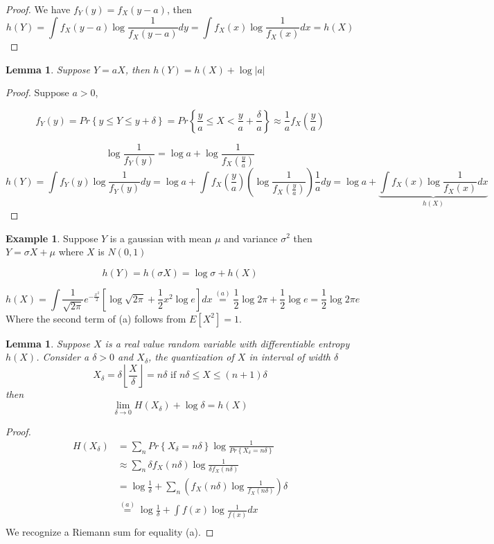 \documentclass[twoside]{article}
\newtheorem{lemma}[theorem]{Lemma}
\theoremstyle{definition} %
\newtheorem{example}{Example}
\renewcommand{\Pr}[1]{Pr\left\{#1\right\}}
\newcommand{\Ex}[1]{E\left[#1\right]}
\newcommand{\pfrac}[2]{\left( \frac{#1}{#2} \right)}
\newcommand{\overeq}[1]{\stackrel{#1}{=}}
\begin{document}
\begin{proof}
  We have $f_Y(y) = f_X(y-a)$, then
  \[
    h(Y) = \int f_X(y-a) \log \frac 1 {f_X(y-a)}dy = \int f_X(x) \log \frac 1 {f_X(x)}dx = h(X)
  \]
\end{proof}

\begin{lemma}
  Suppose $Y=aX$, then $h(Y) = h(X) + \log |a|$
\end{lemma}

\begin{proof}
  Suppose $a > 0$,

  \[
    f_Y(y) = \Pr{y\leq Y \leq y + \delta} = \Pr{\frac y a \leq X < \frac y a + \frac \delta a} \approx \frac 1 a f_X \pfrac y a
  \]

  \[
    \log \frac 1 {f_Y(y)} = \log a + \log \frac 1 {f_X\pfrac y a}
  \]
  \[
    h(Y) = \int f_Y(y) \log \frac 1 {f_Y(y)} dy = \log a + \int f_X \pfrac y a \left(\log \frac 1 {f_X\pfrac y a} \right) \frac 1 a dy = \log a + \underbrace{\int f_X(x) \log \frac 1 {f_X(x)} dx}_{h(X)}
  \]
\end{proof}

\begin{example}
  Suppose $Y$ is a gaussian with mean $\mu$ and variance $\sigma^2$ then $Y=\sigma X + \mu$ where $X$ is $N(0,1)$

  \[
    h(Y) = h(\sigma X) = \log \sigma + h(X)
  \]

  \[
    h(X) = \int \frac 1 {\sqrt{2\pi}} e^{-\frac {x^2} 2} \left[ \log \sqrt{2\pi} + \frac 1 2 x^2 \log e \right] dx
    \overeq{(a)} \frac 1 2 \log 2\pi + \frac 1 2 \log e = \frac 1 2 \log 2\pi e
  \]
  Where the second term of (a) follows from $\Ex{X^2} = 1$.
\end{example}

\begin{lemma}
  Suppose $X$ is a real value random variable with differentiable entropy $h(X)$. Consider a $\delta > 0$ and $X_\delta$, the quantization of $X$ in interval of width $\delta$
  \[
    X_\delta = \delta \left\lfloor \frac X \delta \right\rfloor = n\delta \text{ if } n\delta \leq X \leq (n+1) \delta
  \]
  then
  \[
    \lim_{\delta \to 0} H(X_\delta) + \log \delta = h(X)
  \]
\end{lemma}

\begin{proof}
\begin{align*}
  H(X_\delta) &= \sum_n \Pr{X_\delta = n\delta} \log \frac 1 {\Pr{X_\delta = n\delta}}\\
  &\approx \sum_n \delta f_X(n\delta) \log \frac 1 {\delta f_X(n\delta)}\\
  &= \log \frac 1 \delta + \sum_n \left(f_X(n\delta) \log \frac 1 {f_X(n\delta)} \right)\delta\\
  &\overeq{(a)} \log \frac 1 \delta + \int f(x) \log \frac 1 {f(x)} dx\\
\end{align*}
We recognize a Riemann sum for equality (a).
\end{proof}
\end{document}
